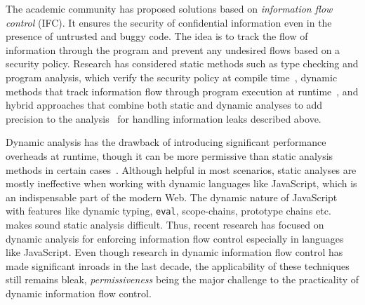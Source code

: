 The academic community has proposed solutions based on
\emph{information flow control} (IFC). It ensures the security of
confidential information even in the presence of untrusted and buggy
code. The idea is to track the flow of information through the program
and prevent any undesired flows based on a security policy. 
Research has considered static methods such as type checking and
program analysis, which verify the security policy at compile
time~\cite{denning76, denning77, myersJFlow, volpano, pottier2003,
  hunt2006:types, LBIFS, hammer09ijis}, 
dynamic methods that track information flow through program execution
at runtime~\cite{fenton, plas09, plas10, Askarov09, Sabelfeld10, SME,
  csf12, austin12POPL, jeeves, plas14, cowl},    
and hybrid approaches that combine both static and dynamic analyses to add
precision to the analysis~\cite{Nentwich07, Gurvan06, Gurvan07,
  russo10CSF, vogt07NDSS, post14, csf15Hedin} 
for handling information leaks described above. 

Dynamic analysis has the drawback of introducing significant
performance overheads at runtime, though it can be more permissive
than static analysis methods in certain
cases~\cite{russo10CSF}. Although helpful in most  
scenarios, static analyses are mostly ineffective when working with
dynamic languages like JavaScript, which is an indispensable part of
the modern Web. The dynamic nature of
JavaScript~\cite{richards11ECOOP, oopsla13} with features like dynamic
typing, \texttt{eval},  scope-chains, prototype chains etc. makes sound
static analysis difficult. Thus, recent research has focused on
dynamic analysis for enforcing information flow control especially in
languages like JavaScript. Even though research in dynamic information
flow control has made significant inroads in the last decade, the
applicability of these techniques still remains bleak, 
\emph{permissiveness} being the major challenge to
the practicality of dynamic information flow control. 

